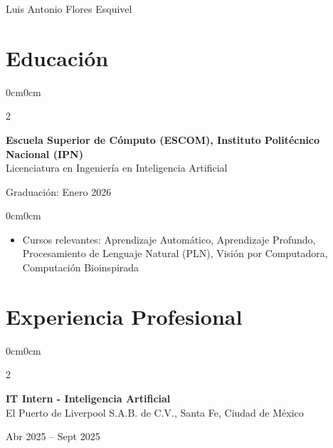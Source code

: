 \documentclass[10pt, letterpaper]{article}
\newenvironment{highlights}{
	\begin{itemize}[topsep=0.15cm,itemsep=0pt,leftmargin=10pt]
	}{
	\end{itemize}
}
\newenvironment{onecolentry}{
	\begin{adjustwidth}{0cm}{0cm}
	}{
	\end{adjustwidth}
	\vspace{0.02cm}
}
\newenvironment{twocolentry}[1]{
	\onecolentry
	\columnratio{0.75} 
	\begin{paracol}{2}
		\raggedright #1
		\switchcolumn
	}{
	\end{paracol}
	\endonecolentry
}
\newenvironment{header}{
	\centering\linespread{1.4}
}{}
\begin{document}
	
	\begin{header}
		{\fontsize{20pt}{20pt}\selectfont Luis Antonio Flores Esquivel}
		
		\vspace{6pt}

	\end{header}

	
	\section{Educación}
	
	\begin{twocolentry}{\textbf{Escuela Superior de Cómputo (ESCOM), Instituto Politécnico Nacional (IPN)}\\
	Licenciatura en Ingeniería en Inteligencia Artificial}
	{Graduación: Enero 2026}

	\end{twocolentry}
	
	\begin{onecolentry}
		\begin{highlights}
			\item Cursos relevantes: Aprendizaje Automático, Aprendizaje Profundo, Procesamiento de Lenguaje Natural (PLN), Visión por Computadora, Computación Bioinspirada
		\end{highlights}
	\end{onecolentry}
	
	\section{Experiencia Profesional}
	
	\begin{twocolentry}
		{\textbf{IT Intern - Inteligencia Artificial}
		\\ El Puerto de Liverpool S.A.B. de C.V., Santa Fe, Ciudad de México}
		{Abr 2025 -- Sept 2025}
	\end{twocolentry}
	
\end{document}
